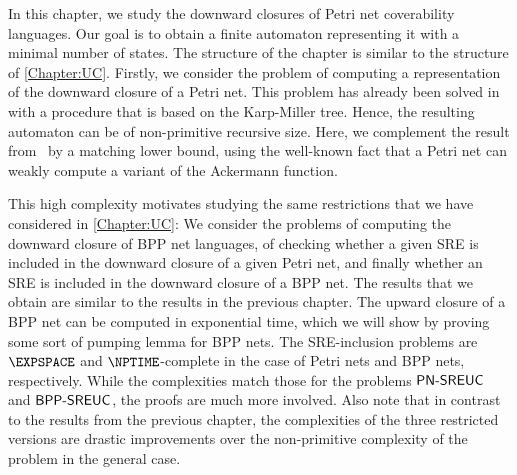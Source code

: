 \documentclass[../../diss.tex]{subfiles}
\begin{document}
In this chapter, we study the downward closures of Petri net coverability languages.
Our goal is to obtain a finite automaton representing it with a minimal number of states.
The structure of the chapter is similar to the structure of \cref{Chapter:UC}.
Firstly, we consider the problem of computing a representation of the downward closure of a Petri net.
This problem has already been solved in~\cite{HabermehlMW10} with a procedure that is based on the Karp-Miller tree.
Hence, the resulting automaton can be of non-primitive recursive size.
Here, we complement the result from~\cite{HabermehlMW10} by a matching lower bound, using the well-known fact that a Petri net can weakly compute a variant of the Ackermann function.

This high complexity motivates studying the same restrictions that we have considered in \cref{Chapter:UC}:
We consider the problems of computing the downward closure of BPP net languages, of checking whether a given SRE is included in the downward closure of a given Petri net, and finally whether an SRE is included in the downward closure of a BPP net.
The results that we obtain are similar to the results in the previous chapter.
The upward closure of a BPP net can be computed in exponential time, which we will show by proving some sort of pumping lemma for BPP nets.
%
The SRE-inclusion problems are $\EXPSPACE$ and $\NPTIME$-complete in the case of Petri nets and BPP nets, respectively.
While the complexities match those for the problems $\mathsf{PN\text{-}SREUC}$ and $\mathsf{BPP\text{-}SREUC}$, the proofs are much more involved.
%
Also note that in contrast to the results from the previous chapter, the complexities of the three restricted versions are drastic improvements over the non-primitive complexity of the problem in the general case.
\end{document}
